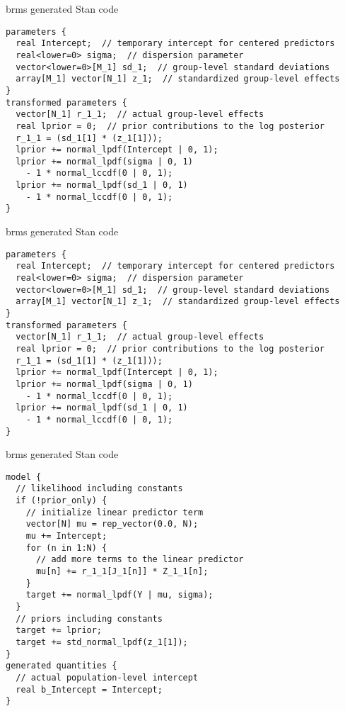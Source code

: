 \documentclass[finnish,english,t]{beamer}
\begin{document}
\begin{frame}[fragile]{brms generated Stan code}

  \vspace{-\baselineskip}
\begin{verbatim}
parameters {
  real Intercept;  // temporary intercept for centered predictors
  real<lower=0> sigma;  // dispersion parameter
  vector<lower=0>[M_1] sd_1;  // group-level standard deviations
  array[M_1] vector[N_1] z_1;  // standardized group-level effects
}
transformed parameters {
  vector[N_1] r_1_1;  // actual group-level effects
  real lprior = 0;  // prior contributions to the log posterior
  r_1_1 = (sd_1[1] * (z_1[1]));
  lprior += normal_lpdf(Intercept | 0, 1);
  lprior += normal_lpdf(sigma | 0, 1)
    - 1 * normal_lccdf(0 | 0, 1);
  lprior += normal_lpdf(sd_1 | 0, 1)
    - 1 * normal_lccdf(0 | 0, 1);
}
\end{verbatim}
  
\end{frame}

\begin{frame}[fragile]{brms generated Stan code}

  \vspace{-\baselineskip}
\begin{verbatim}
parameters {
  real Intercept;  // temporary intercept for centered predictors
  real<lower=0> sigma;  // dispersion parameter
  vector<lower=0>[M_1] sd_1;  // group-level standard deviations
  array[M_1] vector[N_1] z_1;  // standardized group-level effects
}
transformed parameters {
  vector[N_1] r_1_1;  // actual group-level effects
  real lprior = 0;  // prior contributions to the log posterior
  r_1_1 = (sd_1[1] * (z_1[1]));
  lprior += normal_lpdf(Intercept | 0, 1);
  lprior += normal_lpdf(sigma | 0, 1)
    - 1 * normal_lccdf(0 | 0, 1);
  lprior += normal_lpdf(sd_1 | 0, 1)
    - 1 * normal_lccdf(0 | 0, 1);
}
\end{verbatim}
  
\end{frame}

\begin{frame}[fragile]{brms generated Stan code}

  \vspace{-\baselineskip}
\begin{verbatim}
model {
  // likelihood including constants
  if (!prior_only) {
    // initialize linear predictor term
    vector[N] mu = rep_vector(0.0, N);
    mu += Intercept;
    for (n in 1:N) {
      // add more terms to the linear predictor
      mu[n] += r_1_1[J_1[n]] * Z_1_1[n];
    }
    target += normal_lpdf(Y | mu, sigma);
  }
  // priors including constants
  target += lprior;
  target += std_normal_lpdf(z_1[1]);
}
generated quantities {
  // actual population-level intercept
  real b_Intercept = Intercept;
}
\end{verbatim}

\end{frame}
\end{document}
